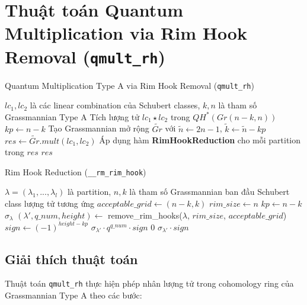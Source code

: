 \section*{Thuật toán Quantum Multiplication via Rim Hook Removal (\texttt{qmult\_rh})}

\begin{algorithm}[H]
\caption{Quantum Multiplication Type A via Rim Hook Removal (\texttt{qmult\_rh})}
\begin{algorithmic}[1]
\REQUIRE $lc_1, lc_2$ là các linear combination của Schubert classes, $k, n$ là tham số Grassmannian Type A
\ENSURE Tích lượng tử $lc_1 \star lc_2$ trong $QH^*(Gr(n-k,n))$
\STATE $kp \gets n - k$
\STATE Tạo Grassmannian mở rộng $\widetilde{Gr}$ với $\widetilde{n} \gets 2n - 1$, $\widetilde{k} \gets \widetilde{n} - kp$
\STATE $res \gets \widetilde{Gr}.mult(lc_1, lc_2)$ 
\STATE Áp dụng hàm \textbf{RimHookReduction} cho mỗi partition trong $res$
\RETURN $res$
\end{algorithmic}
\end{algorithm}

\begin{algorithm}[H]
\caption{Rim Hook Reduction (\texttt{\_\_rm\_rim\_hook})}
\begin{algorithmic}[1]
\REQUIRE $\lambda = (\lambda_1, ..., \lambda_l)$ là partition, $n, k$ là tham số Grassmannian ban đầu
\ENSURE Schubert class lượng tử tương ứng
\STATE $acceptable\_grid \gets (n-k, k)$
\STATE $rim\_size \gets n$
\STATE $kp \gets n - k$
    \RETURN $\sigma_\lambda$ 
\ENDIF
\STATE $(\lambda', q\_num, height) \gets$ remove\_rim\_hooks($\lambda$, $rim\_size$, $acceptable\_grid$)
\STATE $sign \gets (-1)^{height - kp}$
    \RETURN $\sigma_{\lambda'} \cdot q^{q\_num} \cdot sign$ 
    \RETURN $0$ 
\ELSE
    \RETURN $\sigma_{\lambda'} \cdot sign$ 
\ENDIF
\end{algorithmic}
\end{algorithm}

\subsection*{Giải thích thuật toán}

Thuật toán \texttt{qmult\_rh} thực hiện phép nhân lượng tử trong cohomology ring của Grassmannian Type A theo các bước:


